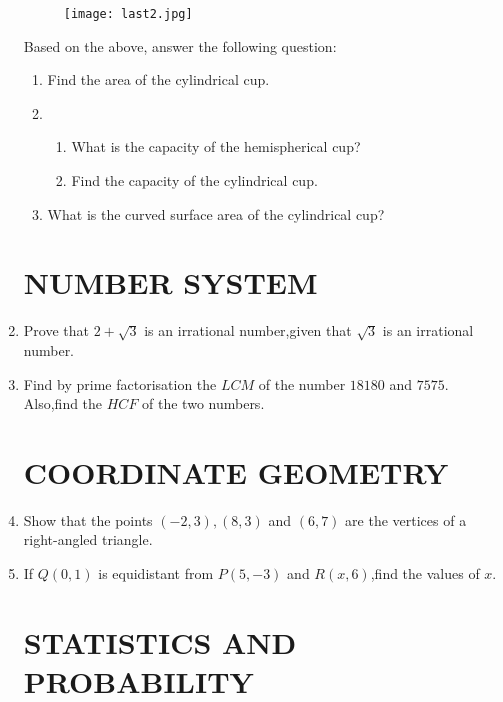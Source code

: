 \documentclass[12pt,-letter paper]{article}
\providecommand{\brak}[1]{\ensuremath{\left(#1\right)}}
\begin{document}
\begin{enumerate}
	
	\begin{figure}[!ht]
		\centering
		\texttt{[image: last2.jpg]}
		\caption{}
		\label{fig:enter-label}
	\end{figure}

	\text Based on the above, answer the following question:
	\begin{enumerate}
		\item  Find the area of the cylindrical cup.
		\item
		\begin{enumerate}
			\item  What is the capacity of the hemispherical cup?
			\item Find the capacity of the cylindrical cup.
		\end{enumerate}
		\item   What is the curved surface area of the cylindrical cup?
	\end{enumerate}


\begin{center}
    \section*{NUMBER SYSTEM}
\end{center}

\item Prove that $ 2+\sqrt3 $ is an irrational number,given that $ \sqrt3 $ is an irrational number.

\item Find by prime factorisation the $LCM$ of the number $18180$ and $7575$. Also,find the $HCF$ of the two numbers.

\begin{center}
    \section*{COORDINATE GEOMETRY}
\end{center}

\item Show that the points $\brak{-2,3}, \brak{8,3}$ and $\brak{6,7} $ are the vertices of a right-angled triangle.

\item If $Q\brak{0,1}$ is equidistant from $P\brak{5,-3}$ and $R\brak{x,6}$,find the values of $x$.

\begin{center}
    \section*{STATISTICS AND PROBABILITY }
\end{center}


\end{enumerate}
\end{document}
